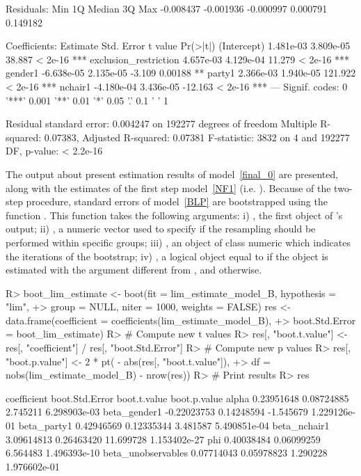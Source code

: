 \documentclass[nojss]{jss}
\begin{document}
\begin{CodeChunk}
\begin{CodeOutput}
Residuals:
Min        1Q    Median        3Q       Max 
-0.008437 -0.001936 -0.000997  0.000791  0.149182 

Coefficients:
Estimate Std. Error t value Pr(>|t|)    
(Intercept)            1.481e-03  3.809e-05  38.887  < 2e-16 ***
exclusion_restriction  4.657e-03  4.129e-04  11.279  < 2e-16 ***
gender1               -6.638e-05  2.135e-05  -3.109  0.00188 ** 
party1                 2.366e-03  1.940e-05 121.922  < 2e-16 ***
nchair1               -4.180e-04  3.436e-05 -12.163  < 2e-16 ***
---
Signif. codes:  0 '***' 0.001 '**' 0.01 '*' 0.05 '.' 0.1 ' ' 1

Residual standard error: 0.004247 on 192277 degrees of freedom
Multiple R-squared:  0.07383,	Adjusted R-squared:  0.07381 
F-statistic:  3832 on 4 and 192277 DF,  p-value: < 2.2e-16
\end{CodeOutput}
\end{CodeChunk}
The output about present estimation results of model~\ref{final_0} are presented, along with the estimates of the first step model~\ref{NF1} (i.e. ). Because of the two-step procedure, standard errors of model~\ref{BLP} are bootstrapped using the function . This function takes the following arguments: i) , the first object of 's output; ii) , a numeric vector used to specify if the resampling should be performed within specific groups; iii) , an object of class numeric which indicates the iterations of the bootstrap; iv) 
, a logical object equal to  if the object  is estimated with the argument  different from , and  otherwise.
\begin{CodeChunk}
\begin{CodeInput}
R> boot_lim_estimate <- boot(fit = lim_estimate_model_B, hypothesis = "lim",
+> group = NULL, niter = 1000, weights = FALSE)
res <- data.frame(coefficient = coefficients(lim_estimate_model_B),
+> boot.Std.Error = boot_lim_estimate)
R> # Compute new t values
R> res[, "boot.t.value"] <- res[, "coefficient"] / res[, "boot.Std.Error"]
R> # Compute new p values
R> res[, "boot.p.value"] <- 2 * pt( - abs(res[, "boot.t.value"]),
+> df = nobs(lim_estimate_model_B) - nrow(res))
R> # Print results
R> res
\end{CodeInput}
\begin{CodeOutput}
coefficient boot.Std.Error boot.t.value boot.p.value
alpha               0.23951648     0.08724885     2.745211 6.298903e-03
beta_gender1       -0.22023753     0.14248594    -1.545679 1.229126e-01
beta_party1         0.42946569     0.12335344     3.481587 5.490851e-04
beta_nchair1        3.09614813     0.26463420    11.699728 1.153402e-27
phi                 0.40038484     0.06099259     6.564483 1.496393e-10
beta_unobservables  0.07714043     0.05978823     1.290228 1.976602e-01
\end{CodeOutput}
\end{CodeChunk}
\end{document}

